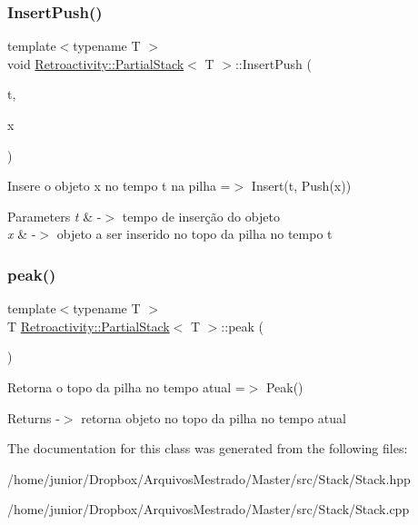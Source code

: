 \subsubsection{\texorpdfstring{Insert\+Push()}{InsertPush()}}
{\footnotesize\ttfamily template$<$typename T $>$ \\
void \hyperlink{classRetroactivity_1_1PartialStack}{Retroactivity\+::\+Partial\+Stack}$<$ T $>$\+::Insert\+Push (\begin{DoxyParamCaption}\item[{int}]{t,  }\item[{const T \&}]{x }\end{DoxyParamCaption})}

Insere o objeto x no tempo t na pilha =$>$ Insert(t, Push(x))


\begin{DoxyParams}{Parameters}
{\em t} & -\/$>$ tempo de inserção do objeto \\
\hline
{\em x} & -\/$>$ objeto a ser inserido no topo da pilha no tempo t \\
\hline
\end{DoxyParams}
\mbox{\label{classRetroactivity_1_1PartialStack_acae5efe5b39b6369f11bb574bc15d73e}} 
\subsubsection{\texorpdfstring{peak()}{peak()}}
{\footnotesize\ttfamily template$<$typename T $>$ \\
T \hyperlink{classRetroactivity_1_1PartialStack}{Retroactivity\+::\+Partial\+Stack}$<$ T $>$\+::peak (\begin{DoxyParamCaption}{ }\end{DoxyParamCaption})}

Retorna o topo da pilha no tempo atual =$>$ Peak()

\begin{DoxyReturn}{Returns}
-\/$>$ retorna objeto no topo da pilha no tempo atual 
\end{DoxyReturn}


The documentation for this class was generated from the following files\+:\begin{DoxyCompactItemize}
\item 
/home/junior/\+Dropbox/\+Arquivos\+Mestrado/\+Master/src/\+Stack/Stack.\+hpp\item 
/home/junior/\+Dropbox/\+Arquivos\+Mestrado/\+Master/src/\+Stack/Stack.\+cpp\end{DoxyCompactItemize}
